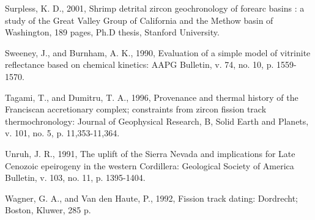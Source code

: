 \documentclass[11pt,twoside]{article}
\begin{document}
\begin{description}
\item Surpless,  K. D., 2001, Shrimp detrital  zircon geochronology of
forearc basins :  a study of the Great Valley  Group of California and
the  Methow basin  of  Washington, 189  pages,  Ph.D thesis,  Stanford
University.

\item Sweeney,  J., and Burnham, A.  K., 1990, Evaluation  of a simple
model  of  vitrinite  reflectance  based on  chemical  kinetics:  AAPG
Bulletin, v. 74, no. 10, p. 1559-1570.

\item Tagami,  T., and  Dumitru, T. A.,  1996, Provenance  and thermal
history  of  the  Franciscan  accretionary complex;  constraints  from
zircon   fission  track   thermochronology:  Journal   of  Geophysical
Research, B, Solid Earth and Planets, v. 101, no. 5, p. 11,353-11,364.

\item  Unruh,  J.  R., 1991,  The  uplift  of  the Sierra  Nevada  and
implications for  Late Cenozoic epeirogeny in  the western Cordillera:
Geological   Society   of   America   Bulletin,  v.   103,   no.   11,
p. 1395-1404.

\item  Wagner, G.  A.,  and Van  den  Haute, P.,  1992, Fission  track
dating: Dordrecht; Boston, Kluwer, 285 p.

\end{description}
\end{document}
